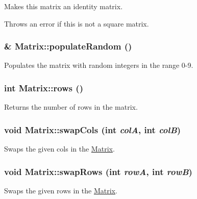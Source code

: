 Makes this matrix an identity matrix. 

Throws an error if this is not a square matrix. \hypertarget{class_matrix_a375fc575a7e042d0eed3d76c7470e59f}{
\subsubsection[{populateRandom}]{ \& Matrix::populateRandom ()}}
\label{class_matrix_a375fc575a7e042d0eed3d76c7470e59f}


Populates the matrix with random integers in the range 0-\/9. 

\hypertarget{class_matrix_add9c23e5ff5e2456a8d48024ab19fe96}{
\subsubsection[{rows}]{\setlength{\rightskip}{0pt plus 5cm}int Matrix::rows ()}}
\label{class_matrix_add9c23e5ff5e2456a8d48024ab19fe96}


Returns the number of rows in the matrix. 

\hypertarget{class_matrix_a505f924baa7c236280751499da56ecee}{
\subsubsection[{swapCols}]{\setlength{\rightskip}{0pt plus 5cm}void Matrix::swapCols (int {\em colA}, \/  int {\em colB})}}
\label{class_matrix_a505f924baa7c236280751499da56ecee}


Swaps the given cols in the \hyperlink{class_matrix}{Matrix}. 

\hypertarget{class_matrix_ac0e73d5e98817e12b82a3f626c8343de}{
\subsubsection[{swapRows}]{\setlength{\rightskip}{0pt plus 5cm}void Matrix::swapRows (int {\em rowA}, \/  int {\em rowB})}}
\label{class_matrix_ac0e73d5e98817e12b82a3f626c8343de}


Swaps the given rows in the \hyperlink{class_matrix}{Matrix}. 

